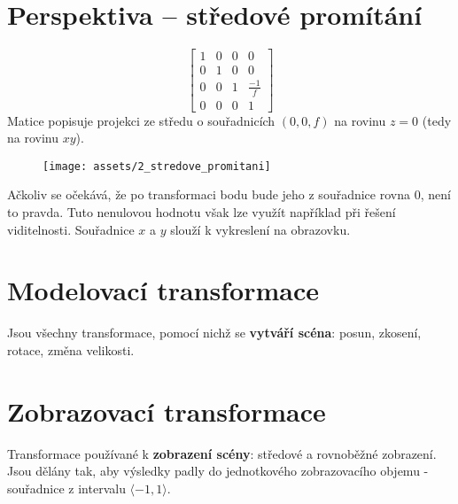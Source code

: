 \section{Perspektiva -- středové promítání}
\begin{equation*}
    \begin{bmatrix}
        1 & 0 & 0 & 0            \\[0.3em]
        0 & 1 & 0 & 0            \\[0.3em]
        0 & 0 & 1 & \frac{-1}{f} \\[0.3em]
        0 & 0 & 0 & 1
    \end{bmatrix}
\end{equation*}
Matice popisuje projekci ze středu o souřadnicích $(0, 0, f)$ na rovinu $z = 0$ (tedy na rovinu  $xy$).
\begin{figure}[H]
    \centering
    \texttt{[image: assets/2\_stredove\_promitani]}
\end{figure}
Ačkoliv se očekává, že po transformaci bodu bude jeho z souřadnice rovna $0$, není to pravda. Tuto nenulovou hodnotu však lze využít například při řešení viditelnosti. Souřadnice $x$ a $y$ slouží k vykreslení na obrazovku.
\section{Modelovací transformace}
Jsou všechny transformace, pomocí nichž se \textbf{vytváří scéna}: posun, zkosení, rotace, změna velikosti.

\section{Zobrazovací transformace}
Transformace používané k \textbf{zobrazení scény}: středové a rovnoběžné zobrazení. Jsou dělány tak, aby výsledky padly do jednotkového zobrazovacího objemu - souřadnice z intervalu $\langle -1, 1 \rangle$.